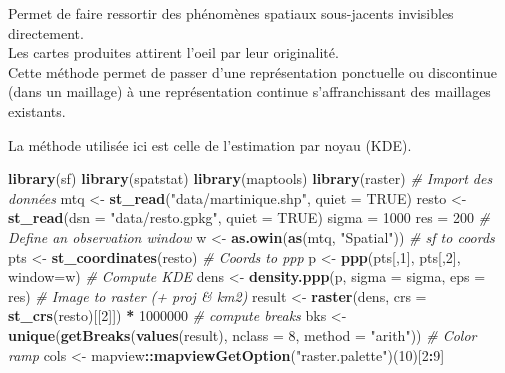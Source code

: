 \documentclass[]{book}
\newenvironment{Shaded}{\begin{snugshade}}{\end{snugshade}}
\newcommand{\KeywordTok}[1]{\textcolor[rgb]{0.13,0.29,0.53}{\textbf{#1}}}
\newcommand{\DataTypeTok}[1]{\textcolor[rgb]{0.13,0.29,0.53}{#1}}
\newcommand{\DecValTok}[1]{\textcolor[rgb]{0.00,0.00,0.81}{#1}}
\newcommand{\StringTok}[1]{\textcolor[rgb]{0.31,0.60,0.02}{#1}}
\newcommand{\CommentTok}[1]{\textcolor[rgb]{0.56,0.35,0.01}{\textit{#1}}}
\newcommand{\OtherTok}[1]{\textcolor[rgb]{0.56,0.35,0.01}{#1}}
\newcommand{\OperatorTok}[1]{\textcolor[rgb]{0.81,0.36,0.00}{\textbf{#1}}}
\newcommand{\NormalTok}[1]{#1}
\begin{document}
Permet de faire ressortir des phénomènes spatiaux sous-jacents
invisibles directement.\\
Les cartes produites attirent l'oeil par leur originalité.\\
Cette méthode permet de passer d'une représentation ponctuelle ou
discontinue (dans un maillage) à une représentation continue
s'affranchissant des maillages existants.

La méthode utilisée ici est celle de l'estimation par noyau (KDE).

\begin{Shaded}
\begin{Highlighting}[]
\KeywordTok{library}\NormalTok{(sf)}
\KeywordTok{library}\NormalTok{(spatstat)}
\KeywordTok{library}\NormalTok{(maptools)}
\KeywordTok{library}\NormalTok{(raster)}
\CommentTok{# Import des données}
\NormalTok{mtq <-}\StringTok{ }\KeywordTok{st_read}\NormalTok{(}\StringTok{"data/martinique.shp"}\NormalTok{, }\DataTypeTok{quiet =} \OtherTok{TRUE}\NormalTok{)}
\NormalTok{resto <-}\StringTok{ }\KeywordTok{st_read}\NormalTok{(}\DataTypeTok{dsn =} \StringTok{"data/resto.gpkg"}\NormalTok{, }\DataTypeTok{quiet =} \OtherTok{TRUE}\NormalTok{)}
\NormalTok{sigma =}\StringTok{ }\DecValTok{1000}
\NormalTok{res =}\StringTok{ }\DecValTok{200}
\CommentTok{# Define an observation window}
\NormalTok{w <-}\StringTok{ }\KeywordTok{as.owin}\NormalTok{(}\KeywordTok{as}\NormalTok{(mtq, }\StringTok{"Spatial"}\NormalTok{))}
\CommentTok{# sf to coords}
\NormalTok{pts <-}\StringTok{ }\KeywordTok{st_coordinates}\NormalTok{(resto)}
\CommentTok{# Coords to ppp}
\NormalTok{p <-}\StringTok{ }\KeywordTok{ppp}\NormalTok{(pts[,}\DecValTok{1}\NormalTok{], pts[,}\DecValTok{2}\NormalTok{], }\DataTypeTok{window=}\NormalTok{w)}
\CommentTok{# Compute KDE}
\NormalTok{dens <-}\StringTok{ }\KeywordTok{density.ppp}\NormalTok{(p, }\DataTypeTok{sigma =}\NormalTok{ sigma, }\DataTypeTok{eps =}\NormalTok{ res)}
\CommentTok{# Image to raster (+ proj & km2)}
\NormalTok{result <-}\StringTok{ }\KeywordTok{raster}\NormalTok{(dens, }\DataTypeTok{crs =} \KeywordTok{st_crs}\NormalTok{(resto)[[}\DecValTok{2}\NormalTok{]]) }\OperatorTok{*}\StringTok{ }\DecValTok{1000000}
\CommentTok{# compute breaks}
\NormalTok{bks <-}\StringTok{ }\KeywordTok{unique}\NormalTok{(}\KeywordTok{getBreaks}\NormalTok{(}\KeywordTok{values}\NormalTok{(result), }\DataTypeTok{nclass =} \DecValTok{8}\NormalTok{, }\DataTypeTok{method =} \StringTok{"arith"}\NormalTok{))}
\CommentTok{# Color ramp}
\NormalTok{cols <-}\StringTok{ }\NormalTok{mapview}\OperatorTok{::}\KeywordTok{mapviewGetOption}\NormalTok{(}\StringTok{"raster.palette"}\NormalTok{)(}\DecValTok{10}\NormalTok{)[}\DecValTok{2}\OperatorTok{:}\DecValTok{9}\NormalTok{]}

\end{Highlighting}
\end{Shaded}
\end{document}
